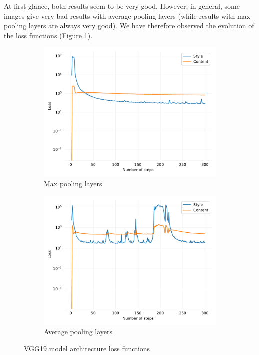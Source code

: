 \documentclass[twocolumn,superscriptaddress,aps, floatfix]{revtex4-1}
\begin{document}
    At first glance, both results seem to be very good. However, in general, some images give very bad results with average pooling layers (while results with max pooling layers are always very good). We have therefore observed the evolution of the loss functions (Figure \ref{fig:model.architecture.loss}).
    
    \begin{figure}[ht]
        \centering
        \begin{subfigure}[b]{0.22\textwidth}
            \centering
            \includegraphics[width=\textwidth]{resources/pdf/architecture/sun-trees-paris-maxpool.pdf}
            \caption{Max pooling layers}
        \end{subfigure}
        \hfill
        \begin{subfigure}[b]{0.22\textwidth}
            \centering
            \includegraphics[width=\textwidth]{resources/pdf/architecture/sun-trees-paris-avgpool.pdf}
            \caption{Average pooling layers}
        \end{subfigure}
        \caption{VGG19 model architecture loss functions}
        \label{fig:model.architecture.loss}
    \end{figure}
    
\end{document}
